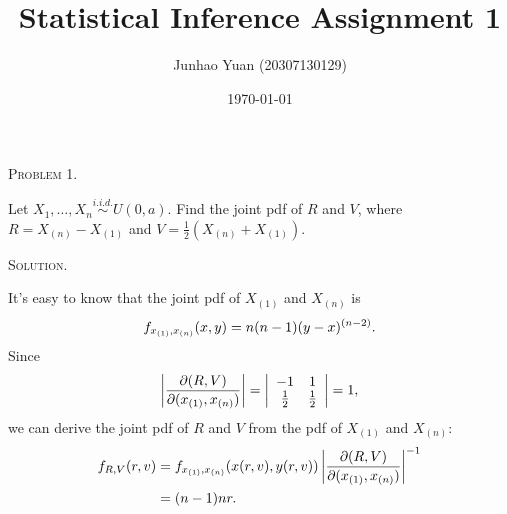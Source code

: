 \documentclass{article}
\title{\textbf{Statistical Inference Assignment 1}}
\author{Junhao Yuan (20307130129)}
\date{\today}
\begin{document}
\begin{CJK}{UTF8}{gbsn}

    \maketitle

    \newtheorem{lemma}{Lemma}[]

    \begin{shaded}
        \noindent\textsc{Problem 1.}\par
        Let $X_1,\ldots, X_n \mathop{\sim}\limits^{i.i.d.} U(0,a)$. Find the joint pdf of $R$ and $V$, where
        $R=X_{(n)}-X_{(1)}$ and $V=\frac{1}{2}(X_{(n)} + X_{(1)})$.
    \end{shaded}
    \noindent\textsc{Solution.}\par
    It's easy to know that the joint pdf of $X_{(1)}$ and $X_{(n)}$ is
    \begin{align}
        f_{x_{(1)},x_{(n)}}(x,y)=n(n-1)(y-x)^{(n-2)}.\notag
    \end{align}
    Since
    \begin{align}
        \left | \frac{\partial (R, V)}{\partial (x_{(1)}, x_{(n)})} \right |=
        \left |
        \begin{array}{cc}
            -1          & 1           \\
            \frac{1}{2} & \frac{1}{2} \\
        \end{array}
        \right |
        = 1,\notag
    \end{align}
    we can derive the joint pdf of $R$ and $V$ from the pdf of $X_{(1)}$ and $X_{(n)}$:
    \begin{align}
        f_{R,V}(r,v) & =f_{x_{(1)},x_{(n)}}(x(r,v),y(r,v))\left | \frac{\partial (R, V)}{\partial (x_{(1)}, x_{(n)})} \right |^{-1}\notag \\
                     & =(n-1)nr.\notag
    \end{align}


\end{CJK}
\end{document}
